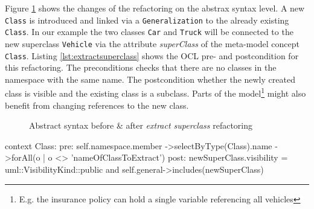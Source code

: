 \documentclass{llncs}
\begin{document}
Figure \ref{fig:extract} shows the changes of the refactoring on the abstrax syntax level. A new \texttt{Class} is 
introduced and linked via a \texttt{Generalization} to the already existing \texttt{Class}. In our example the two 
classes \texttt{Car} and \texttt{Truck} will be connected to the new superclass \texttt{Vehicle} via the attribute 
\textit{superClass} of the meta-model concept \texttt{Class}. Listing \ref{lst:extractsuperclass} shows the OCL pre- and 
postcondition for this refactoring. The preconditions checks that there are no classes in the namespace with the 
same name. The postcondition whether the newly created class is visible and the existing class is a subclass. 
Parts of the model\footnote{E.g. the insurance policy can hold a single variable referencing all vehicles} might also benefit 
from changing references to the new class.

\begin{figure}
 \label{fig:extract}
 \caption{Abstract syntax before \& after \textit{extract superclass} refactoring}
\end{figure}

\begin{lstsingle}[language=OCL,caption=OCL for \textit{extract superclass} refactoring,label=lst:extractsuperclass]
context Class:
pre:  self.namespace.member
        ->selectByType(Class).name
        ->forAll(o | o <> 'nameOfClassToExtract')
post: newSuperClass.visibility = uml::VisibilityKind::public
      and 
      self.general->includes(newSuperClass)
\end{lstsingle}
\end{document}
